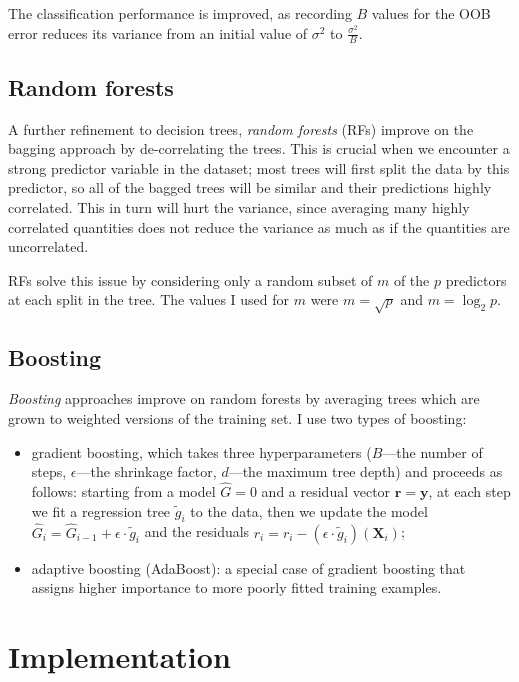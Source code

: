 \documentclass[11pt]{article}
\numberwithin{equation}{section}
\begin{document}
The classification performance is improved, as recording $B$ values for the OOB error reduces its variance from an initial value of $\sigma^2$ to $\frac{\sigma^2}{B}$.

\subsection{Random forests}

A further refinement to decision trees, \textit{random forests} (RFs) improve on the bagging approach by de-correlating the trees. This is crucial when we encounter a strong predictor variable in the dataset; most trees will first split the data by this predictor, so all of the bagged trees will be similar and their predictions highly correlated. This in turn will hurt the variance, since averaging many highly correlated quantities does not reduce the variance as much as if the quantities are uncorrelated.

RFs solve this issue by considering only a random subset of $m$ of the $p$ predictors at each split in the tree. The values I used for $m$ were $m = \sqrt{p}$ and $m = \log_2p$.

\subsection{Boosting}

\textit{Boosting} approaches improve on random forests by averaging trees which are grown to weighted versions of the training set. I use two types of boosting:
\begin{itemize}
\item gradient boosting, which takes three hyperparameters ($B$---the number of steps, $\epsilon$---the shrinkage factor, $d$---the maximum tree depth) and proceeds as follows: starting from a model $\hat{G} = 0$ and a residual vector $\mathbf{r} = \mathbf{y}$, at each step we fit a regression tree $\tilde{g}_i$ to the data, then we update the model $\hat{G}_i = \hat{G}_{i-1} + \epsilon \cdot \tilde{g}_i$ and the residuals $r_i = r_i - (\epsilon \cdot \tilde{g}_i)(\mathbf{X}_i)$;
\item adaptive boosting (AdaBoost): a special case of gradient boosting that assigns higher importance to more poorly fitted training examples.
\end{itemize}

\section{Implementation}
\end{document}
